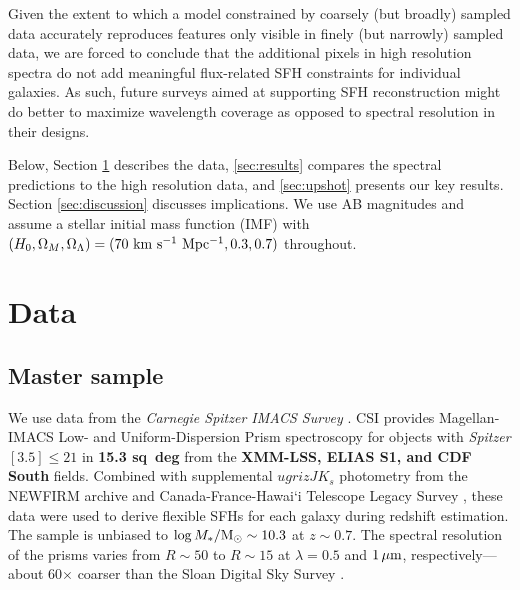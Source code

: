 \documentclass[a4paper,fleqn,usenatbib]{mnras}
\newcommand{\Msun}{{\rm M}_\odot}
\newcommand{\Mstel}{M_\ast}
\newcommand{\logM}{\log\Mstel/\Msun}
\newcommand{\resp}{respectively}
\newcommand{\bfr}{\bf\color{red}}
\begin{document}
Given the extent to which a model constrained by coarsely (but broadly) sampled data 
accurately reproduces features only visible in finely (but narrowly) sampled data, we are 
forced to conclude that the additional pixels in high resolution spectra do not add meaningful 
flux-related SFH constraints for individual galaxies. As such, future surveys aimed at supporting 
SFH reconstruction might do better to maximize wavelength coverage as opposed to spectral 
resolution in their designs.

Below, Section \ref{sec:data} describes the data, \ref{sec:results} compares 
the spectral predictions to the high resolution data, and \ref{sec:upshot} presents our key results. 
Section \ref{sec:discussion} discusses implications. We use AB magnitudes and assume 
a \citet{Chabrier03} stellar initial mass function (IMF) with $(H_{0}, \Omega_{M}, \Omega_{\Lambda}) =
(70~{\rm km~s^{-1}~Mpc^{-1}}, 0.3, 0.7)$ throughout.



\section{Data}
\label{sec:data}

\subsection{Master sample}
\label{sec:master}

We use data from the {\it Carnegie Spitzer IMACS Survey} \citep[CSI;][]{Kelson14a}. CSI provides
Magellan-IMACS Low- and Uniform-Dispersion Prism spectroscopy \citep{Coil11} for objects with {\it Spitzer} 
$[3.5]\leq21$ in {\bfr 15.3 sq~deg} from the {\bfr XMM-LSS, ELIAS S1, and CDF South} fields. 
Combined with supplemental 
$ugrizJK_{s}$ photometry from the NEWFIRM archive \citep{Autry03} and 
Canada-France-Hawai`i Telescope Legacy Survey \citep[CFHTLS][]{Cuillandre06}, these data were used to derive 
flexible SFHs for each galaxy during redshift estimation. The sample is unbiased to 
$\logM\sim10.3$ at $z\sim0.7$. The spectral resolution of the prisms varies from 
$R\sim50$ to $R\sim15$ at $\lambda=0.5$ and $1\,\hbox{$\mu$m}$, \resp---about 
60$\times$ coarser than the Sloan Digital Sky Survey \citep{York00}.
\end{document}
